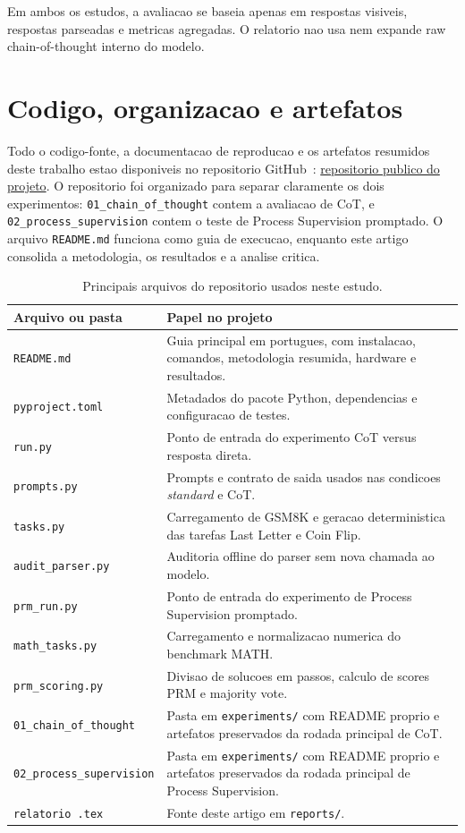 \documentclass[a4paper,12pt]{article}
\begin{document}
Em ambos os estudos, a avaliacao se baseia apenas em respostas visiveis,
respostas parseadas e metricas agregadas. O relatorio nao usa nem expande raw
chain-of-thought interno do modelo.

\section{Codigo, organizacao e artefatos}

Todo o codigo-fonte, a documentacao de reproducao e os artefatos resumidos
deste trabalho estao disponiveis no repositorio GitHub~\cite{repo}:
\href{https://github.com/costadev00/gpt-oss-eval-chain-of-thought}{repositorio
publico do projeto}. O
repositorio foi organizado para separar claramente os dois experimentos:
\texttt{01\_chain\_of\_thought} contem a avaliacao de CoT, e
\texttt{02\_process\_supervision} contem o teste de Process
Supervision promptado. O arquivo \texttt{README.md} funciona como guia de
execucao, enquanto este artigo consolida a metodologia, os resultados e a
analise critica.

\begin{table}[h]
\centering
\caption{Principais arquivos do repositorio usados neste estudo.}
\label{tab:repo_files}
\begin{tabularx}{\textwidth}{p{}X}
\toprule
Arquivo ou pasta & Papel no projeto \\
\midrule
\texttt{README.md} & Guia principal em portugues, com instalacao, comandos,
metodologia resumida, hardware e resultados. \\
\texttt{pyproject.toml} & Metadados do pacote Python, dependencias e
configuracao de testes. \\
\texttt{run.py} & Ponto de entrada do experimento CoT versus resposta
direta. \\
\texttt{prompts.py} & Prompts e contrato de saida usados nas
condicoes \emph{standard} e CoT. \\
\texttt{tasks.py} & Carregamento de GSM8K e geracao deterministica
das tarefas Last Letter e Coin Flip. \\
\texttt{audit\_parser.py} & Auditoria offline do parser sem nova
chamada ao modelo. \\
\texttt{prm\_run.py} & Ponto de entrada do experimento de Process
Supervision promptado. \\
\texttt{math\_tasks.py} & Carregamento e normalizacao numerica do
benchmark MATH. \\
\texttt{prm\_scoring.py} & Divisao de solucoes em passos, calculo de
scores PRM e majority vote. \\
\texttt{01\_chain\_of\_thought} & Pasta em \texttt{experiments/} com README
proprio e artefatos preservados da rodada principal de CoT. \\
\texttt{02\_process\_supervision} & Pasta em \texttt{experiments/} com README
proprio e artefatos preservados da rodada principal de Process Supervision. \\
\texttt{relatorio .tex} & Fonte deste artigo em \texttt{reports/}. \\
\bottomrule
\end{tabularx}
\end{table}
\end{document}
